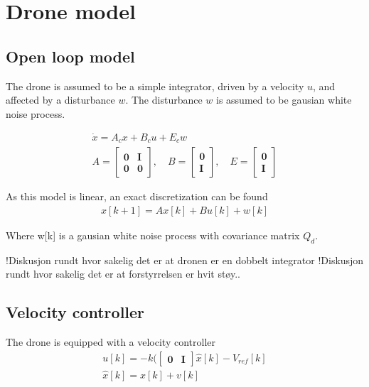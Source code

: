 \section{Drone model}

\subsection{Open loop model}

The drone is assumed to be a simple integrator, driven by a velocity $u$, and affected by a disturbance $w$. The disturbance $w$ is assumed to be gausian white noise process. 

\begin{align}
    \dot{x}  = A_c x + B_c u + E_c w\\
    A  = \begin{bmatrix} \mathbf{0} & \mathbf{I} \\ \mathbf{0} & \mathbf{0} \end{bmatrix}, \quad 
    B  = \begin{bmatrix} \mathbf{0}  \\ \mathbf{I} \end{bmatrix} , \quad 
    E  = \begin{bmatrix} \mathbf{0}  \\ \mathbf{I} \end{bmatrix} 
\end{align}

As this model is linear, an exact discretization can be found
\begin{align}
    x[k+1]  = A x[k] + B u[k] + w[k]
\end{align}

Where w[k] is a gausian white noise process with covariance matrix $Q_d$.

!Diskusjon rundt hvor sakelig det er at dronen er en dobbelt integrator
!Diskusjon rundt hvor sakelig det er at forstyrrelsen er hvit støy..

\subsection{Velocity controller}

The drone is equipped with a velocity controller
\begin{align}
    u[k] = - k ( \begin{bmatrix} \mathbf{0} & \mathbf{I} \end{bmatrix} \hat{x}[k] - V_{ref}[k] \\
    \hat{x}[k] = x[k] + v[k]
\end{align}


